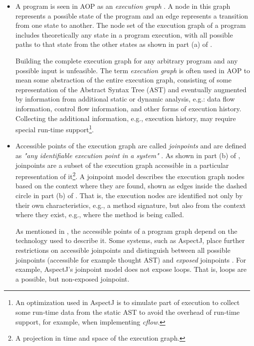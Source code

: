 \begin{itemize}
\item A program is seen in AOP as an \textit{execution graph} \cite{aop.modeling.03}. A node in this graph represents a possible state of the program and an edge represents a transition from one state to another. The node set of the execution graph of a program includes theoretically any state in a program execution, with all possible paths to that state from the other states as shown in part (a) of .

Building the complete execution graph for any arbitrary program and any possible input is unfeasible. The term \textit{execution graph} is often used in AOP to mean some abstraction of the entire execution graph, consisting of some representation of the Abstract Syntax Tree (AST) and eventually augmented by information from additional static or dynamic analysis, e.g.: data flow information, control flow information, and other forms of execution history. Collecting the additional information, e.g., execution history, may require special run-time support\footnote{An optimization used in  AspectJ \cite{www.aspectjt} is to simulate part of execution to collect some run-time data from the static AST to avoid the overhead of run-time support, for example, when implementing \textit{cflow}.}.

\item Accessible points of the execution graph are called \textit{joinpoints} and are defined as \textit{"any identifiable execution point in a system"} \cite{Laddad.aop}.
%
As shown in part (b) of , joinpoints are a subset of the execution graph accessible in a particular representation of it\footnote{A projection in time and space of the execution graph.}. A joinpoint model describes the execution graph nodes based on the context where they are found, shown as edges inside the dashed circle in part (b) of . That is, the execution nodes are identified not only by their own characteristics, e.g., a method signature, but also from the context where they exist, e.g., where the method is being called.

As mentioned in , the accessible points of a program graph depend on the technology used to describe it. Some systems, such as AspectJ, place further restrictions on accessible joinpoints and distinguish between all possible joinpoints (accessible for example thought AST) and \textit{exposed} joinpoints \cite{Laddad.aop}. For example, AspectJ's joinpoint model does not expose loops. That is, loops are a possible, but non-exposed joinpoint.


\end{itemize}
